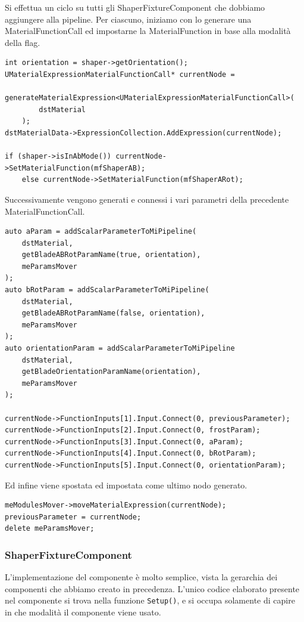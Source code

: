 \documentclass[main.tex]{subfiles}
\begin{document}
Si effettua un ciclo su tutti gli ShaperFixtureComponent che dobbiamo aggiungere alla pipeline. Per ciascuno, iniziamo con lo generare una MaterialFunctionCall ed impostarne la MaterialFunction in base alla modalità della flag.
\begin{lstlisting}
int orientation = shaper->getOrientation();
UMaterialExpressionMaterialFunctionCall* currentNode =
    generateMaterialExpression<UMaterialExpressionMaterialFunctionCall>(
        dstMaterial
    );
dstMaterialData->ExpressionCollection.AddExpression(currentNode);

if (shaper->isInAbMode()) currentNode->SetMaterialFunction(mfShaperAB);
    else currentNode->SetMaterialFunction(mfShaperARot);
\end{lstlisting}
Successivamente vengono generati e connessi i vari parametri della precedente MaterialFunctionCall.
\begin{lstlisting}
auto aParam = addScalarParameterToMiPipeline(
    dstMaterial,
    getBladeABRotParamName(true, orientation),
    meParamsMover
);
auto bRotParam = addScalarParameterToMiPipeline(
    dstMaterial,
    getBladeABRotParamName(false, orientation),
    meParamsMover
);
auto orientationParam = addScalarParameterToMiPipeline
    dstMaterial,
    getBladeOrientationParamName(orientation),
    meParamsMover
);

currentNode->FunctionInputs[1].Input.Connect(0, previousParameter);
currentNode->FunctionInputs[2].Input.Connect(0, frostParam);
currentNode->FunctionInputs[3].Input.Connect(0, aParam);
currentNode->FunctionInputs[4].Input.Connect(0, bRotParam);
currentNode->FunctionInputs[5].Input.Connect(0, orientationParam);
\end{lstlisting}
Ed infine viene spostata ed impostata come ultimo nodo generato.
\begin{lstlisting}
meModulesMover->moveMaterialExpression(currentNode);
previousParameter = currentNode;
delete meParamsMover;
\end{lstlisting}

\subsubsection{ShaperFixtureComponent}\label{subsec:5_1_ShaperFixtureComponent}
L'implementazione del componente è molto semplice, vista la gerarchia dei componenti che abbiamo creato in precedenza. L'unico codice elaborato presente nel componente si trova nella funzione \lstinline{Setup()}, e si occupa solamente di capire in che modalità il componente viene usato. 
\end{document}
